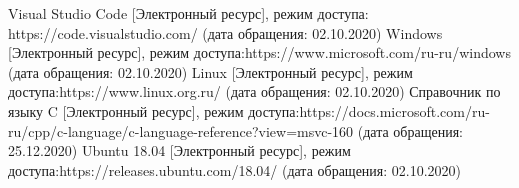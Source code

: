 \begin{thebibliography}{3}
	Visual Studio Code [Электронный ресурс], режим доступа: https://code.visualstudio.com/ (дата обращения: 02.10.2020)
	Windows [Электронный ресурс], режим доступа:https://www.microsoft.com/ru-ru/windows (дата обращения: 02.10.2020)
	Linux [Электронный ресурс], режим доступа:https://www.linux.org.ru/ (дата обращения: 02.10.2020)
	Справочник по языку C [Электронный ресурс], режим доступа:https://docs.microsoft.com/ru-ru/cpp/c-language/c-language-reference?view=msvc-160 (дата обращения: 25.12.2020)
	Ubuntu 18.04 [Электронный ресурс], режим доступа:https://releases.ubuntu.com/18.04/ (дата обращения: 02.10.2020)
\end{thebibliography}
